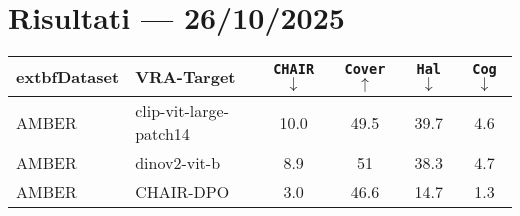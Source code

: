 \documentclass[a4paper,11pt]{article}
\begin{document}
	
	\section*{Risultati --- 26/10/2025}
	
	\begin{table}[h]
		\centering
		\begin{tabular}{ll|cccc}
			\toprule
				extbf{Dataset} & \textbf{VRA-Target} & \texttt{CHAIR} $\downarrow$ & \texttt{Cover} $\uparrow$ & \texttt{Hal} $\downarrow$ & \texttt{Cog} $\downarrow$ \\
			\midrule
			AMBER & clip-vit-large-patch14 & \textcolor{red!90}{10.0} & \textcolor{red!90}{49.5} & \textcolor{red!90}{39.7} & \textcolor{green!50!black!50}{4.6} \\
			\midrule
			AMBER & dinov2-vit-b & \textcolor{green!50!black!50}{8.9} & \textcolor{green!50!black!50}{51} & \textcolor{green!50!black!50}{38.3} & \textcolor{red!90}{4.7} \\
			\midrule \midrule
			AMBER & CHAIR-DPO & 3.0 & 46.6 & 14.7 & 1.3 \\
			\bottomrule
		\end{tabular}
	\end{table}
	
\end{document}
